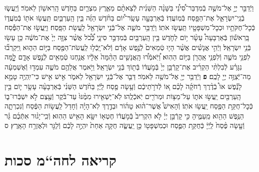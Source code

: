 \documentclass[twoside, openany, parskip=half, 11pt]{book}
\begin{document}
\begin{footnotesize}
\begin{multicols}{2}
\\
\\
וַיְֿדַבֵּ֣ר יְיָ֣ אֶל־מֹשֶׁ֣ה בְֿמִדְבַּר־סִ֠ינַ֠י בַּשָּׁנָ֨ה הַשֵּׁנִ֜ית לְֿצֵאתָ֨ם מֵאֶ֧רֶץ מִצְרַ֛יִם בַּחֹ֥דֶשׁ הָֽרִאשׁ֖וֹן לֵאמֹֽר׃ וְֿיַֽעֲשׂ֧וּ בְֿנֵֽי־יִשְׂרָאֵ֛ל אֶת־הַפָּ֖סַח בְּֿמֽוֹעֲדֽוֹ׃ בְּֿאַרְבָּעָ֣ה עָשָֽׂר־י֠וֹם בַּחֹ֨דֶשׁ הַזֶּ֜ה בֵּ֧ין הָֽעַרְבַּ֛יִם תַּֽעֲשׂ֥וּ אֹת֖וֹ בְּֿמֹֽעֲד֑וֹ כְּֿכׇל־חֻקֹּתָ֥יו וּכְכׇל־מִשְׁפָּטָ֖יו תַּֽעֲשׂ֥וּ אֹתֽוֹ׃ וַיְֿדַבֵּ֥ר מֹשֶׁ֛ה אֶל־בְּֿנֵ֥י יִשְׂרָאֵ֖ל לַֽעֲשׂ֥ת הַפָּֽסַח׃ וַיַּֽעֲשׂ֣וּ אֶת־הַפֶּ֡סַח בָּֽרִאשׁ֡וֹן בְּֿאַרְבָּעָה֩ עָשָׂ֨ר י֥וֹם לַחֹ֛דֶשׁ בֵּ֥ין הָֽעַרְבַּ֖יִם בְּֿמִדְבַּ֣ר סִינָ֑י כְּֿ֠כֹ֠ל אֲשֶׁ֨ר צִוָּ֤ה יְיָ֙ אֶת־מֹשֶׁ֔ה כֵּ֥ן עָשׂ֖וּ בְּֿנֵ֥י יִשְׂרָאֵֽל׃
וַיְֿהִ֣י אֲנָשִׁ֗ים אֲשֶׁ֨ר הָי֤וּ טְֿמֵאִים֙ לְֿנֶ֣פֶשׁ אָדָ֔ם וְֿלֹא־יָֽכְֿל֥וּ לַֽעֲשֹׂת־הַפֶּ֖סַח בַּיּ֣וֹם הַה֑וּא וַֽיִּקְרְב֞וּ לִפְנֵ֥י מֹשֶׁ֛ה וְֿלִפְנֵ֥י אַֽהֲרֹ֖ן בַּיּ֥וֹם הַהֽוּא׃ וַ֠יֹּֽאמְֿר֠וּ הָֽאֲנָשִׁ֤ים הָהֵ֨מָּה֙ אֵלָ֔יו אֲנַ֥חְנוּ טְֿמֵאִ֖ים לְֿנֶ֣פֶשׁ אָדָ֑ם לׇׇׇָ֣מָּה נִגָּרַ֗ע לְֿבִלְתִּ֨י הַקְרִ֜יב אֶת־קָרְֿבַּ֤ן יְיָ֙ בְּֿמֹ֣עֲד֔וֹ בְּֿת֖וֹךְ בְּֿנֵ֥י יִשְׂרָאֵֽל׃ וַיֹּ֥אמֶר אֲלֵהֶ֖ם מֹשֶׁ֑ה עִמְד֣וּ וְֿאֶשְׁמְעָ֔ה מַה־יְּֿצַוֶּ֥ה יְיָ֖ לָכֶֽם׃ \textbf{פ}
וַיְֿדַבֵּ֥ר יְיָ֖ אֶל־מֹשֶׁ֥ה לֵּאמֹֽר׃ דַּבֵּ֛ר אֶל־בְּֿנֵ֥י יִשְׂרָאֵ֖ל לֵאמֹ֑ר אִ֣ישׁ אִ֣ישׁ כִּי־יִֽהְיֶ֥ה טָמֵ֣א לָנֶ֡פֶשׁ אוֹ֩ בְֿדֶ֨רֶךְ רְֿחֹקָ֜הֹ לָכֶ֗ם א֚וֹ לְֿדֹרֹ֣תֵיכֶ֔ם וְֿעָ֥שָׂה פֶ֖סַח לַֽיְֿיָ׃ בַּחֹ֨דֶשׁ הַשֵּׁנִ֜י בְּֿאַרְבָּעָ֨ה עָשָׂ֥ר י֛וֹם בֵּ֥ין הָֽעַרְבַּ֖יִם יַֽעֲשׂ֣וּ אֹת֑וֹ עַל־מַצּ֥וֹת וּמְרֹרִ֖ים יֹֽאכְֿלֻֽהוּ׃ לֹֽא־יַשְׁאִ֤ירוּ מִמֶּ֨נּוּ֙ עַד־בֹּ֔קֶר וְֿעֶ֖צֶם לֹ֣א יִשְׁבְּֿרוּ־ב֑וֹ כְּֿכׇל־חֻקַּ֥ת הַפֶּ֖סַח יַֽעֲשׂ֥וּ אֹתֽוֹ׃ וְֿהָאִישׁ֩ אֲשֶׁר־ה֨וּא טָה֜וֹר וּבְדֶ֣רֶךְ לֹֽא־הָיָ֗ה וְֿחָדַל֙ לַֽעֲשׂ֣וֹת הַפֶּ֔סַח וְֿנִכְרְתָ֛ה הַנֶּ֥פֶשׁ הַהִ֖וא מֵֽעַמֶּ֑יהָ כִּ֣י קָרְֿבַּ֣ן יְיָ֗ לֹ֤א הִקְרִיב֙ בְּֿמֹ֣עֲד֔וֹ חֶטְא֥וֹ יִשָּׂ֖א הָאִ֥ישׁ הַהֽוּא׃ וְֿכִֽי־יָג֨וּר אִתְּֿכֶ֜ם גֵּ֗ר וְֿעָ֤שָׂה פֶ֨סַח֙ לַֽיְֿיָ֔ כְּֿחֻקַּ֥ת הַפֶּ֛סַח וּכְמִשְׁפָּט֖וֹ כֵּ֣ן יַֽעֲשֶׂ֑ה חֻקָּ֤ה אַחַת֙ יִהְיֶ֣ה לָכֶ֔ם וְֿלַגֵּ֖ר וּלְאֶזְרַ֥ח הָאָֽרֶץ׃ ס

\end{multicols}

\clearpage

\section[חה“מ סכות]{קריאה לחה“מ סכות}


\end{footnotesize}
\end{document}
